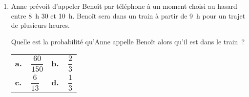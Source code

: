 \begin{enumerate}
\begin{tabularx}{\linewidth}{XX}
     \end{tabularx}
     \item  Anne prévoit d'appeler Benoît par téléphone à un moment choisi au hasard entre
     8~h 30 et 10~h. Benoît sera dans un train à partir de 9~h pour un trajet de plusieurs
     heures.
     \par
     Quelle est la probabilité qu'Anne appelle Benoît alors qu'il est dans le train~?
     \begin{tabularx}{\linewidth}{XX} %
          \textbf{a.~~}$\dfrac{60}{150}$&\textbf{b.~~}$\dfrac{2}{3}$\\
          \textbf{c.~~}$\dfrac{6}{13}$&\textbf{d.~~}$\dfrac{1}{3}$\\
     \end{tabularx}
\end{enumerate}
